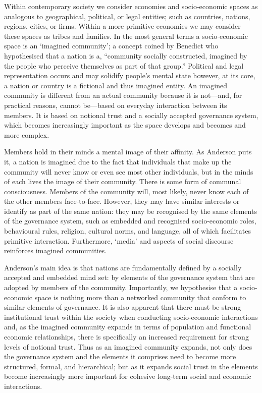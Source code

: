 Within contemporary society we consider economies and socio-economic spaces as analogous to geographical, political, or legal entities; such as countries, nations, regions, cities, or firms. Within a more primitive economies we may consider these spaces as tribes and families. In the most general terms a socio-economic space is an `imagined community'; a concept coined by Benedict \citet[p.~6--7]{Anderson1983b} who hypothesised that a nation is a, ``community socially constructed, imagined by the people who perceive themselves as part of that group.'' Political and legal representation occurs and may solidify people's mental state however, at its core, a nation or country is a fictional and thus imagined entity. An imagined community is different from an actual community because it is not---and, for practical reasons, cannot be---based on everyday interaction between its members. It is based on notional trust and a socially accepted governance system, which becomes increasingly important as the space develops and becomes and more complex.

Members hold in their minds a mental image of their affinity. As Anderson puts it, a nation is imagined due to the fact that individuals that make up the community will never know or even see most other individuals, but in the minds of each lives the image of their community. There is some form of communal consciousness. Members of the community will, most likely, never know each of the other members face-to-face. However, they may have similar interests or identify as part of the same nation: they may be recognised by the same elements of the governance system, such as embedded and recognised socio-economic roles, behavioural rules, religion, cultural norms, and language, all of which facilitates primitive interaction. Furthermore, `media' and aspects of social discourse reinforces imagined communities.

Anderson's main idea is that nations are fundamentally defined by a socially accepted and embedded mind set: by elements of the governance system that are adopted by members of the community. Importantly, we hypothesise that a socio-economic space is nothing more than a networked community that conform to similar elements of governance. It is also apparent that there must be strong institutional trust within the society when conducting socio-economic interactions and, as the imagined community expands in terms of population and functional economic relationships, there is specifically an increased requirement for strong levels of notional trust. Thus as an imagined community expands, not only does the governance system and the elements it comprises need to become more structured, formal, and hierarchical; but as it expands social trust in the elements become increasingly more important for cohesive long-term social and economic interactions. 

